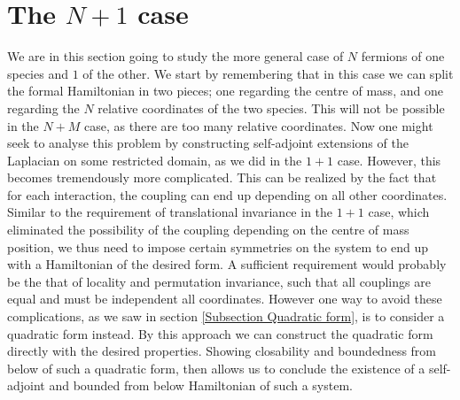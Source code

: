 \documentclass[a4paper,11pt]{article}
\numberwithin{equation}{section}
\begin{document}
\section{The $ N+1 $ case}
We are in this section going to study the more general case of $ N $ fermions of one species and $ 1 $ of the other. We start by remembering that in this case we can split the formal Hamiltonian in two pieces; one regarding the centre of mass, and one regarding the $ N $ relative coordinates of the two species. This will not be possible in the $ N+M $ case, as there are too many relative coordinates. Now one might seek to analyse this problem by constructing self-adjoint extensions of the Laplacian on some restricted domain, as we did in the $ 1+1 $ case. However, this becomes tremendously more complicated. This can be realized by the fact that for each interaction, the coupling can end up depending on all other coordinates. Similar to the requirement of translational invariance in the $ 1+1 $ case, which eliminated the possibility of the coupling depending on the centre of mass position, we thus need to impose certain symmetries on the system to end up with a Hamiltonian of the desired form. A sufficient requirement would probably be the that of locality and permutation invariance, such that all couplings are equal and must be independent all coordinates. However one way to avoid these complications, as we saw in section \ref{Subsection Quadratic form}, is to consider a quadratic form instead. By this approach we can construct the quadratic form directly with the desired properties. Showing closability and boundedness from below of such a quadratic form, then allows us to conclude the existence of a self-adjoint and bounded from below Hamiltonian of such a system.
\end{document}
